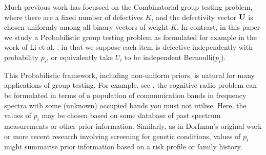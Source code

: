 Much previous work has focussed on the Combinatorial group testing problem, where there are a fixed number of defectives $K$, and the defectivity vector ${\mathbf{ U}}$ is chosen uniformly among all
binary vectors of weight $K$. In contrast, in this paper we study a Probabilistic group testing problem as formulated
for example in the work of Li et al. \cite{li5}, in that we suppose 
 each item is defective  independently with probability \(p_i\), or equivalently take $U_i$ to be independent Bernoulli($p_i$).

This Probabilistic framework, including non-uniform priors, is natural for many applications of group testing.
For example, see \cite{atia2}, the cognitive radio problem can be formulated in terms of  a population
 of communication bands in frequency spectra with some (unknown) occupied bands you must not utilise. Here, the values of $p_i$ may be chosen
 based on some database of past spectrum measurements or other prior information. Similarly, as in Dorfman's original work  \cite{dorfman} or more recent 
research \cite{shental} involving screening for genetic conditions, values of
$p_i$ might summarise prior information based on a risk profile or  family history.
%
